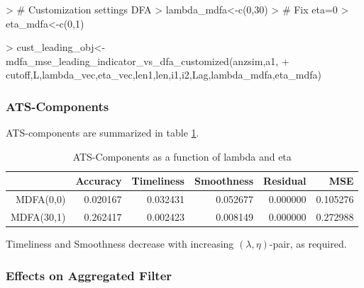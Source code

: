 \documentclass[a4paper]{book}
\begin{document}
\begin{Schunk}
\begin{Sinput}
> # Customization settings DFA
> lambda_mdfa<-c(0,30)
> # Fix eta=0
> eta_mdfa<-c(0,1)
\end{Sinput}
\end{Schunk}
\begin{Schunk}
\begin{Sinput}
> cust_leading_obj<-mdfa_mse_leading_indicator_vs_dfa_customized(anzsim,a1,
+     cutoff,L,lambda_vec,eta_vec,len1,len,i1,i2,Lag,lambda_mdfa,eta_mdfa)  
\end{Sinput}
\end{Schunk}


\subsubsection{ATS-Components}

ATS-components are summarized in table \ref{ats_comp_mdfa_ST}.
\begin{table}[ht]
\centering
\begin{tabular}{rrrrrr}
  \hline
 & Accuracy & Timeliness & Smoothness & Residual & MSE \\ 
  \hline
MDFA(0,0) & 0.020167 & 0.032431 & 0.052677 & 0.000000 & 0.105276 \\ 
  MDFA(30,1) & 0.262417 & 0.002423 & 0.008149 & 0.000000 & 0.272988 \\ 
   \hline
\end{tabular}
\caption{ATS-Components as a function of lambda and eta} 
\label{ats_comp_mdfa_ST}
\end{table}Timeliness and Smoothness decrease  with increasing $(\lambda,\eta)$-pair, as required. 




\subsubsection{Effects on Aggregated Filter}
\end{document}
